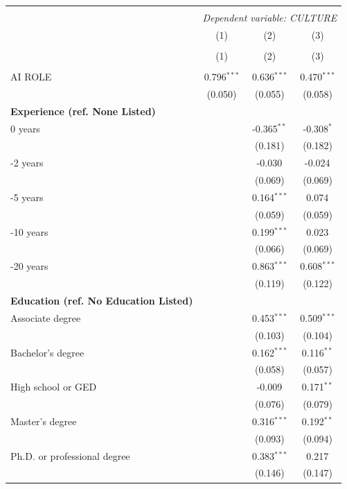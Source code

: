 \begin{table}[!htbp] \centering
\begin{tabular}{@{\extracolsep{5pt}}lccc}
\\[-1.8ex]\hline
\hline \\[-1.8ex]
& \multicolumn{3}{c}{\textit{Dependent variable: CULTURE}} \
\cr \cline{2-4}
\\[-1.8ex] & \multicolumn{1}{c}{(1)} & \multicolumn{1}{c}{(2)} & \multicolumn{1}{c}{(3)}  \\
\\[-1.8ex] & (1) & (2) & (3) \\
\hline \\[-1.8ex]
 AI ROLE & 0.796$^{***}$ & 0.636$^{***}$ & 0.470$^{***}$ \\
& (0.050) & (0.055) & (0.058) \\
 \textbf{Experience (ref. None Listed)}\\
0 years & & -0.365$^{**}$ & -0.308$^{*}$ \\
& & (0.181) & (0.182) \\
 \quad 1-2 years & & -0.030$^{}$ & -0.024$^{}$ \\
& & (0.069) & (0.069) \\
 \quad 3-5 years & & 0.164$^{***}$ & 0.074$^{}$ \\
& & (0.059) & (0.059) \\
 \quad 6-10 years & & 0.199$^{***}$ & 0.023$^{}$ \\
& & (0.066) & (0.069) \\
 \quad 11-20 years & & 0.863$^{***}$ & 0.608$^{***}$ \\
& & (0.119) & (0.122) \\
 \textbf{Education (ref. No Education Listed)}\\
Associate degree & & 0.453$^{***}$ & 0.509$^{***}$ \\
& & (0.103) & (0.104) \\
 \quad Bachelor's degree & & 0.162$^{***}$ & 0.116$^{**}$ \\
& & (0.058) & (0.057) \\
 \quad High school or GED & & -0.009$^{}$ & 0.171$^{**}$ \\
& & (0.076) & (0.079) \\
 \quad Master's degree & & 0.316$^{***}$ & 0.192$^{**}$ \\
& & (0.093) & (0.094) \\
 \quad Ph.D. or professional degree & & 0.383$^{***}$ & 0.217$^{}$ \\
& & (0.146) & (0.147) \\

\end{tabular}
\end{table}
